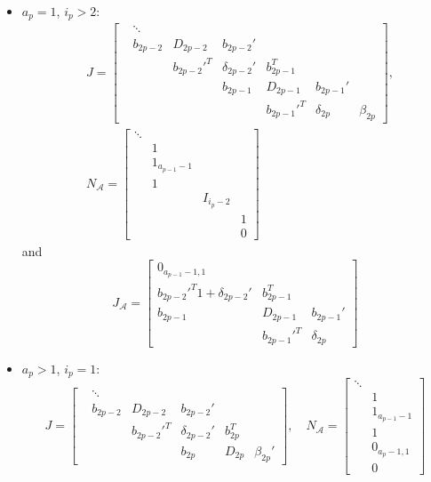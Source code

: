 \documentclass[]{article}
\newcommand{\BIN}{\begin{bmatrix}}
\newcommand{\BOUT}{\end{bmatrix}}
\begin{document}
\begin{itemize}
\begin{equation*}
  \end{equation*}
  \item $a_p = 1$, $i_p>2$:
  \begin{align*}
    &J = \BIN & \ddots   &             &                &             &             &            \\
              & b_{2p-2} & D_{2p-2}    & b_{2p-2}'      &             &             &            \\
              &          & b_{2p-2}'^T & \delta_{2p-2}' & b_{2p-1}^T  &             &            \\
              &          &             & b_{2p-1}       & D_{2p-1}    & b_{2p-1}'   &            \\
              &          &             &                & b_{2p-1}'^T & \delta_{2p} & \beta_{2p} \BOUT,\\
    &N_\mathcal{A} = \BIN \ddots & & & \\ & 1 & & \\ & 1_{a_{p-1}-1} & & \\ & 1 & & \\ & & I_{i_p-2} & \\ & & & 1\\ & & & 0 \BOUT
  \end{align*}
  and
  \begin{equation*}
    J_\mathcal{A} = \BIN 0_{a_{p-1}-1,1}                &             &             \\ 
                         b_{2p-2}'^T 1 + \delta_{2p-2}' & b_{2p-1}^T  &             \\ 
                         b_{2p-1}                       & D_{2p-1}    & b_{2p-1}'   \\ 
                                                        & b_{2p-1}'^T & \delta_{2p} \BOUT
  \end{equation*}
  \item $a_p > 1$, $i_p=1$:
  \begin{equation*}
    J = \BIN & \ddots   &             &                &          &         \\
             & b_{2p-2} & D_{2p-2}    & b_{2p-2}'      &          &         \\
             &          & b_{2p-2}'^T & \delta_{2p-2}' & b_{2p}^T &         \\ 
             &          &             & b_{2p}         & D_{2p}   & \beta_{2p}' \BOUT, \quad
    N_\mathcal{A} = \BIN \ddots & \\ & 1 \\ & 1_{a_{p-1}-1} \\ & 1 \\ & 0_{a_p-1,1} \\ & 0 \BOUT

\end{equation*}
\end{itemize}
\end{document}
